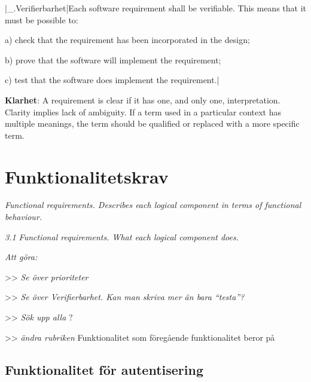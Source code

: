 \documentclass[a4paper, twoside, 11pt, titlepage]{article}
\begin{document}
|\_.Verifierbarhet|Each software requirement shall be verifiable. This means that it must be possible to:

a) check that the requirement has been incorporated in the design;

b) prove that the software will implement the requirement;

c) test that the software does implement the requirement.|

\textbf{Klarhet}: A requirement is clear if it has one, and only one, interpretation. Clarity implies lack of ambiguity. If a term used in a particular context has multiple meanings, the term should be qualified or replaced with a more specific term.

\clearpage
\section{Funktionalitetskrav}


\emph{Functional requirements. Describes each logical component in terms of functional behaviour.}

\emph{3.1 Functional requirements. What each logical component does.}

\emph{Att göra:}

>> \emph{Se över prioriteter}

>> \emph{Se över Verifierbarhet. Kan man skriva mer än bara ``testa''?}

>> \emph{Sök upp alla} ?

>> \emph{ändra rubriken} Funktionalitet som föregående funktionalitet beror på

	\subsection{Funktionalitet för autentisering}
\end{document}
